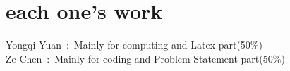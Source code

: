 \documentclass{article}
\begin{document}
\section{each one's work}
Yongqi Yuan\ :\ Mainly for computing and Latex part(50\%) \\
Ze Chen\ :\ Mainly for coding and Problem Statement part(50\%)


\end{document}
